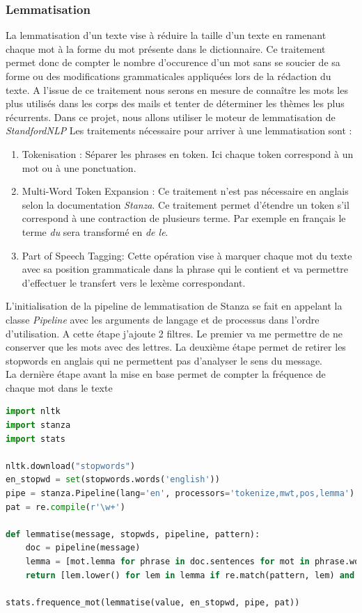 \documentclass[a4paper,12pt]{article}
\begin{document}
			
		\subsubsection{Lemmatisation}
			La lemmatisation d'un texte vise à réduire la taille d'un texte en ramenant chaque mot à la forme du mot présente dans le dictionnaire. Ce traitement permet donc de compter le nombre d'occurence d'un mot sans se soucier de sa forme ou des modifications grammaticales appliquées lors de la rédaction du texte. A l'issue de ce traitement nous serons en mesure de connaître les mots les plus utilisés dans les corps des mails et tenter de déterminer les thèmes les plus récurrents.  
			Dans ce projet, nous allons utiliser le moteur de lemmatisation de \emph{StandfordNLP}\cite{manning-EtAl:2014:P14-5}\cite{qi2020stanza}
			Les traitements nécessaire pour arriver à une lemmatisation sont :
			\begin{enumerate}
				\item Tokenisation : Séparer les phrases en token. Ici chaque token correspond à un mot ou à une ponctuation.
				\item Multi-Word Token Expansion : Ce traitement n'est pas nécessaire en anglais selon la documentation \emph{Stanza}. Ce traitement permet d'étendre un token s'il correspond à une contraction de plusieurs terme. Par exemple en français le terme \emph{du} sera transformé en \emph{de le}.
				\item Part of Speech Tagging: Cette opération vise à marquer chaque mot du texte avec sa position grammaticale dans la phrase qui le contient et va permettre d'effectuer le transfert vers le lexème correspondant.
			\end{enumerate}
			
			L'initialisation de la pipeline de lemmatisation de Stanza se fait en appelant la classe \emph{Pipeline} avec les arguments de langage et de processus dans l'ordre d'utilisation. 
			A cette étape j'ajoute 2 filtres. Le premier va me permettre de ne conserver que les mots avec des lettres.
			La deuxième étape permet de retirer les stopwords en anglais qui ne permettent pas d'analyser le sens du message.\\
			La dernière étape avant la mise en base permet de compter la fréquence de chaque mot dans le texte
			\begin{lstlisting}[title=Pipeline de lemmatisation, language=python]
import nltk
import stanza
import stats

nltk.download("stopwords")
en_stopwd = set(stopwords.words('english'))
pipe = stanza.Pipeline(lang='en', processors='tokenize,mwt,pos,lemma')
pat = re.compile(r'\w+')

def lemmatise(message, stopwds, pipeline, pattern):
    doc = pipeline(message)
    lemma = [mot.lemma for phrase in doc.sentences for mot in phrase.words]
    return [lem.lower() for lem in lemma if re.match(pattern, lem) and lem.lower() not in stopwds]
  
stats.frequence_mot(lemmatise(value, en_stopwd, pipe, pat))
			\end{lstlisting}
\end{document}
